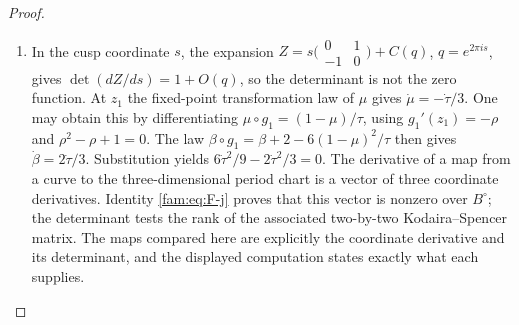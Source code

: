 \begin{proof}
\begin{enumerate}[label=\arabic*.,leftmargin=*]
\item In the cusp coordinate $s$, the expansion
$Z=s\bigl(\begin{smallmatrix}0&1\\-1&0\end{smallmatrix}\bigr)+C(q)$,
$q=e^{2\pi is}$, gives
$\det(dZ/ds)=1+O(q)$, so the determinant is not the zero function.
At $z_1$ the fixed-point transformation law of $\mu$ gives
$\dot\mu=-\dot\tau/3$.  One may obtain this by differentiating
$\mu\circ g_1=(1-\mu)/\tau$, using
$g_1'(z_1)=-\rho$ and $\rho^2-\rho+1=0$.
The law
$\beta\circ g_1=\beta+2-6(1-\mu)^2/\tau$ then gives
$\dot\beta=2\dot\tau/3$.  Substitution yields
$6\dot\tau^2/9-2\dot\tau^2/3=0$.
The derivative of a map from a curve to the three-dimensional period
chart is a vector of three coordinate derivatives.  Identity
\eqref{fam:eq:F-j} proves that this vector is nonzero over $B^\circ$;
the determinant tests the rank of the associated two-by-two
Kodaira--Spencer matrix.  The maps compared here are explicitly the
coordinate derivative and its determinant, and the displayed computation
states exactly what each supplies.
\end{enumerate}
\end{proof}



